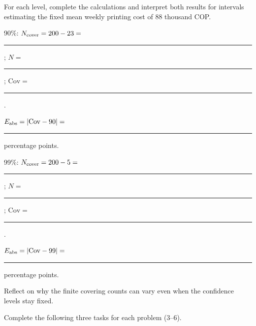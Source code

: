 \par\smallskip
\noindent\begin{minipage}[t]{.49\linewidth}
\vspace{0pt}
\end{minipage}\hfill
\begin{minipage}[t]{.49\linewidth}
\vspace{0pt}
\end{minipage}\par

\par For each level, complete the calculations and interpret both results for intervals estimating the fixed mean weekly printing cost of 88 thousand COP.
\par\noindent\begin{minipage}[t]{0.70\linewidth}
\vspace{0pt}
\par 90\%: $N_{\rm cover}=200-23=$ \rule{.5in}{.3pt}; $N=$ \rule{.4in}{.3pt}; $\mathrm{Cov}=$ \rule{1in}{.3pt}.
\par $E_{\rm abs}=|\mathrm{Cov}-90|=$ \rule{.7in}{.3pt} percentage points. 
\par 99\%: $N_{\rm cover}=200-5=$ \rule{.5in}{.3pt}; $N=$ \rule{.4in}{.3pt}; $\mathrm{Cov}=$ \rule{1in}{.3pt}.
\par $E_{\rm abs}=|\mathrm{Cov}-99|=$ \rule{.7in}{.3pt} percentage points. 
\end{minipage}\hfill
\begin{minipage}[t]{0.28\linewidth}
\vspace{0pt}
\par Reflect on why the finite covering counts can vary even when the confidence levels stay fixed.
\end{minipage}\par


Complete the following three tasks for each problem (3--6).


